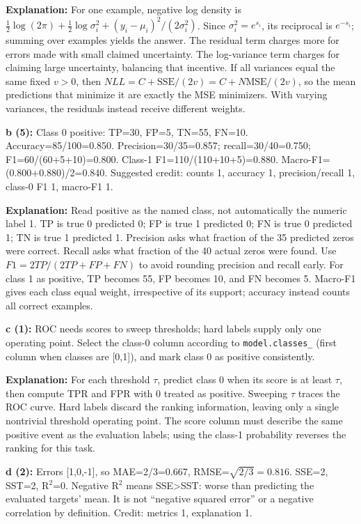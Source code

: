 \documentclass[11pt]{article}
\begin{document}
\textbf{Explanation:} For one example, negative log density is $\frac12\log(2\pi)+\frac12\log\sigma_i^2+(y_i-\mu_i)^2/(2\sigma_i^2)$. Since $\sigma_i^2=e^{s_i}$, its reciprocal is $e^{-s_i}$; summing over examples yields the answer. The residual term charges more for errors made with small claimed uncertainty. The log-variance term charges for claiming large uncertainty, balancing that incentive. If all variances equal the same fixed $v>0$, then $NLL=C+\mathrm{SSE}/(2v)=C+N\mathrm{MSE}/(2v)$, so the mean predictions that minimize it are exactly the MSE minimizers. With varying variances, the residuals instead receive different weights.

\textbf{b (5):} Class 0 positive: TP=30, FP=5, TN=55, FN=10. Accuracy=85/\allowbreak{}100=0.850. Precision=30/\allowbreak{}35=0.857; recall=30/\allowbreak{}40=0.750; F1=60/\allowbreak{}(60+5+10)=0.800. Class-1 F1=110/\allowbreak{}(110+10+5)=0.880. Macro-F1=(0.800+0.880)/\allowbreak{}2=0.840. Suggested credit: counts 1, accuracy 1, precision/\allowbreak{}recall 1, class-0 F1 1, macro-F1 1.

\textbf{Explanation:} Read positive as the named class, not automatically the numeric label 1. TP is true 0 predicted 0; FP is true 1 predicted 0; FN is true 0 predicted 1; TN is true 1 predicted 1. Precision asks what fraction of the 35 predicted zeros were correct. Recall asks what fraction of the 40 actual zeros were found. Use $F1=2TP/(2TP+FP+FN)$ to avoid rounding precision and recall early. For class 1 as positive, TP becomes 55, FP becomes 10, and FN becomes 5. Macro-F1 gives each class equal weight, irrespective of its support; accuracy instead counts all correct examples.

\textbf{c (1):} ROC needs scores to sweep thresholds; hard labels supply only one operating point. Select the class-0 column according to \texttt{model.classes\_} (first column when classes are [0,1]), and mark class 0 as positive consistently.

\textbf{Explanation:} For each threshold $\tau$, predict class 0 when its score is at least $\tau$, then compute TPR and FPR with 0 treated as positive. Sweeping $\tau$ traces the ROC curve. Hard labels discard the ranking information, leaving only a single nontrivial threshold operating point. The score column must describe the same positive event as the evaluation labels; using the class-1 probability reverses the ranking for this task.

\textbf{d (2):} Errors [1,0,-1], so MAE=2/\allowbreak{}3=0.667, RMSE=$\sqrt{2/3}=0.816$. SSE=2, SST=2, R\ensuremath{{}^2}=0. Negative R\ensuremath{{}^2} means SSE>SST: worse than predicting the evaluated targets' mean. It is not “negative squared error” or a negative correlation by definition. Credit: metrics 1, explanation 1.
\end{document}
